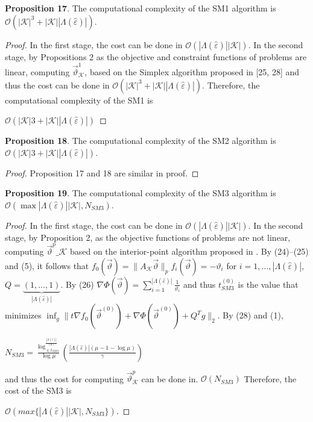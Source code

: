 \documentclass[]{iosart2c}
\begin{document}
  \textbf{Proposition 17}. The computational complexity of the
  SM1 algorithm is $\mathcal{O}(|\mathcal{K}|^3 + |\mathcal{K}| |\Lambda(\hat{\varepsilon} )|)$.

  \begin{proof}
    In the first stage, the cost can be done in
    $\mathcal{O}(|\Lambda(\hat{\varepsilon})| |\mathcal{K}|)$. In the second stage, by Propositions
    2 as the objective and constraint functions of problems
    are linear, computing $\vec{\vartheta}^1_\mathcal{K}$, based on the Simplex
    algorithm proposed in [25, 28] and thus the cost can
    be done in $\mathcal{O}(|\mathcal{K}|^3 + |\mathcal{K}| |\Lambda(\hat{\varepsilon})|)$. Therefore, the computational
    complexity of the SM1 is

    $\mathcal{O}(|\mathcal{K}|3 + |\mathcal{K}| |\Lambda(\hat{\varepsilon})|)$
  \end{proof}

  \textbf{Proposition 18}. The computational complexity of the
  SM2 algorithm is $\mathcal{O}(|\mathcal{K}|3 + |\mathcal{K}| |\Lambda(\hat{\varepsilon})|)$.

  \begin{proof}
    Proposition 17 and 18 are similar in proof.
  \end{proof}

  \textbf{Proposition 19}. The computational complexity of the
  SM3 algorithm is $\mathcal{O}(\max{|\Lambda(\hat{\varepsilon} )| |\mathcal{K}|,N_{SM3}})$.
  \begin{proof}
    In the first stage, the cost can be done in
    $\mathcal{O}(|\Lambda(\hat{\varepsilon})| |\mathcal{K}|)$. In the second stage, by Proposition
    2, as the objective functions of problems are not
    linear, computing $\vec{\vartheta}^p\_\mathcal{K}$
    based on the interior-point algorithm
    proposed in \cite{29}. By (24)–(25) and (5), it
    follows that $f_0(\vec{\vartheta}) = \parallel A_\mathcal{K}\vec{\vartheta}\parallel_p f_i(\vec{\vartheta}) = -\vartheta_i$ for $i =
    1, ... , |\Lambda(\hat{\varepsilon})|$, $Q = \underbrace{(1, ... , 1)}_{|\Lambda(\hat{\varepsilon})|}$. By (26) $\nabla \Phi \left( \vec{\vartheta} \right) = \sum^{|\Lambda(\hat{\varepsilon})|}_{i=1} \frac{1}{\vartheta_i}$
    and thus $t^{(0)}_{SM3}$ is the value that minimizes
    $\inf_g \parallel t \nabla f_0 \left( \vec{\vartheta}^{(0)} \right) +\nabla \Phi \left( \vec{\vartheta}^{(0)} \right)+ Q^T g \parallel _2$. By (28)
    and (1),

    $N_{SM3} = \frac{ \log^{\frac{|\Lambda(\hat{\varepsilon})|}{(0)}}_{\in t_{SM3}}}{\log\mu} \left( \frac{ |\Lambda(\hat{\varepsilon})| (\mu - 1 - \log\mu)}{\gamma} \right)$

    and thus the cost for computing $\vec{\vartheta}^p_\mathcal{K}$ can be done
    in. $\mathcal{O}(N_{SM3})$ Therefore, the cost of the SM3 is

    $\mathcal{O}(max\{|\Lambda(\hat{\varepsilon})| |\mathcal{K}|,N_{SM3}\})$.
  \end{proof}
\end{document}
